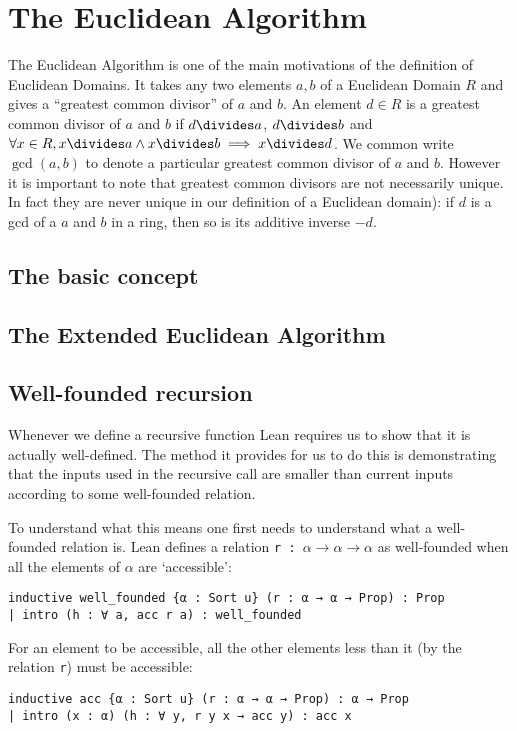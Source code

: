 \documentclass{article}
\renewcommand{\a}{\alpha}
\newcommand{\ct}{\texttt}
\begin{document}



\section{The Euclidean Algorithm}

The Euclidean Algorithm is one of the main motivations of the definition of Euclidean Domains. 
It takes any two elements $a,b$ of a Euclidean Domain $R$ and gives a ``greatest common divisor'' of $a$ and $b$. 
An element $d \in R$ is a greatest common divisor of $a$ and $b$ if $d \divides a$, $d \divides b$ and $\forall x \in R, x \divides a \land x \divides b \implies x \divides d$.
We common write $\gcd(a,b)$ to denote a particular greatest common divisor of $a$ and $b$.
However it is important to note that greatest common divisors are not necessarily unique. In fact they are never unique in our definition of a Euclidean domain): if $d$ is a gcd of a $a$ and $b$ in a ring, then so is its additive inverse $-d$.

\subsection{The basic concept}

\subsection{The Extended Euclidean Algorithm}

\subsection{Well-founded recursion}
Whenever we define a recursive function Lean requires us to show that it is actually well-defined. 
The method it provides for us to do this is demonstrating that the inputs used in the recursive call are smaller than current inputs according to some well-founded relation.

To understand what this means one first needs to understand what a well-founded relation is. Lean defines a relation \ct{r : $\a \to \a \to \a$} as well-founded when all the elements of $\a$ are `accessible':
\begin{lstlisting}
inductive well_founded {α : Sort u} (r : α → α → Prop) : Prop
| intro (h : ∀ a, acc r a) : well_founded
\end{lstlisting}
For an element to be accessible, all the other elements less than it (by the relation \ct{r}) must be accessible:
\begin{lstlisting}
inductive acc {α : Sort u} (r : α → α → Prop) : α → Prop
| intro (x : α) (h : ∀ y, r y x → acc y) : acc x
\end{lstlisting}
\end{document}

